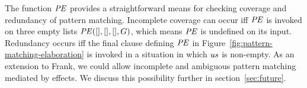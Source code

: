 \documentclass{sigplanconf}
\begin{document}
The function $\mathit{PE}$ provides a straightforward means for checking
coverage and redundancy of pattern matching. Incomplete coverage can
occur iff $\mathit{PE}$ is invoked on three empty lists $\mathit{PE}([],
[], [], G)$, which means $\mathit{PE}$ is undefined on its
input. Redundancy occurs iff the final clause defining $\mathit{PE}$ in
Figure~\ref{fig:pattern-matching-elaboration} is invoked in a
situation in which $\mathit{us}$ is non-empty.
%
As an extension to Frank, we could allow incomplete and ambiguous
pattern matching mediated by effects.
We discuss this possibility further in
section~\ref{sec:future}.

\end{document}

